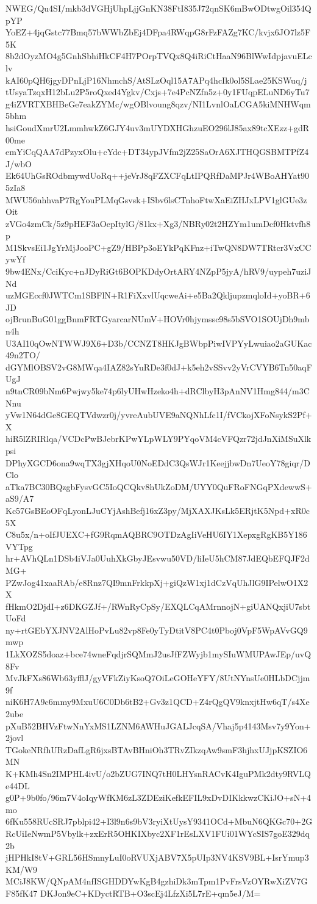 NWEG/Qu4SI/mkb3dVGHjUhpLjjGnKN38FtI835J72qnSK6mBwODtwgOil354QpYP
YoEZ+4jqGstc77Bmq57bWWbZbEj4DFpa4RWqpG8rFzFAZg7KC/kvjx6JO7lz5F5K
8b2dOyzMO4g5GnhSbhiHkCF4H7POrpTVQx8Q4iRiCtHaaN96BlWwIdpjavuELclv
kAI60pQH6jgyDPnLjP16NhmchS/AtSLzOql15A7APq4hcIk0ol5SLae25KSWuq/j
tUsyaTzqxH12bLu2P5roQxed4Ygkv/Cxjs+7e4PcNZfn5z+0y1FUqpELuND6yTu7
g4iZVRTXBHBeGe7eakZYMc/wgOBlvoung8qzv/NI1LvnlOaLCGA5kiMNHWqm5bhm
hsiGoudXmrU2LmmhwkZ6GJY4uv3mUYDXHGhzuEO296lJ85ax89tcXEzz+gdR00me
emYiCqQAA7dPzyxOlu+cYdc+DT34ypJVfm2jZ25SaOrA6XJTHQGSBMTPfZ4J/wbO
Ek64UhGsROdbmywdUoRq++jeVrJ8qFZXCFqLtIPQRfDaMPJr4WBoAHYat905zIa8
MWU56nhhvaP7RgYouPLMqGsvsk+ISbv6lsCTnhoFtwXaEiZHJxLPV1glGUe3zOit
zVGo4zmCk/5z9pHEF3aOepItylG/81kx+Xg3/NBRy02t2HZYm1umDcf0Hktvfh8p
M1SkvsEi1JgYrMjJooPC+gZ9/HBPp3oEYkPqKFnz+iTwQN8DW7TRtcr3VxCCywYf
9bw4ENx/CciKyc+nJDyRiGt6BOPKDdyOrtARY4NZpP5jyA/hRV9/uypeh7uziJNd
uzMGEccf0JWTCm1SBFlN+R1FiXxvlUqcweAi+e5Ba2QkljupzmqloId+yoBR+6JD
ojBrunBuG01ggBnmFRTGyarcarNUmV+HOVr0hjymssc98s5bSVO1SOUjDh9mbn4h
U3AI10qOwNTWWJ9X6+D3b/CCNZT8HKJgBWbpPiwIVPYyLwuiao2aGUKac49n2TO/
dGYMlOBSV2vG8MWqa4IAZ82sYuRDe3f0dJ+k5eh2vSSvv2yVrCVYB6Tn50aqFUgJ
n9tnCR09bNm6Pwjwy5ke74p6lyUHwHzeko4h+dRClbyH3pAnNV1Hmg844/m3CNnu
yVw1N64dGe8GEQTVdwzr0j/yvreAubUVE9aNQNhLfc1I/fVCkojXFoNsykS2Pf+X
hiR5lZRIRlqa/VCDcPwBJebrKPwYLpWLY9PYqoVM4cVFQzr72jdJnXiMSuXlkpsi
DPhyXGCD6ona9wqTX3gjXHqoU0NoEDdC3QsWJr1KeejjbwDn7UeoY78giqr/DClo
aTka7BC30BQzgbFysvGC5IoQCQkv8hUkZoDM/UYY0QuFRoFNGqPXdewwS+aS9/A7
Kc57GsBEoOFqLyonLJuCYjAshBefj16xZ3py/MjXAXJKsLk5ERjtK5Npd+xR0c5X
C8u5x/n+oIfJUEXC+fG9RqmAQBRC9OTDzAgIiVeHU6IY1XepxgRgKB5Y186VYTpg
hr+AVhQLn1DSb4iVJa0UuhXkGbyJEsvwu50VD/liIeU5hCM87JdEQbEFQJF2dMG+
PZwJog41xaaRAb/e8Rnz7QI9mnFrkkpXj+giQzW1xj1dCzVqUhJlG9IPelwO1X2X
fHkmO2DjdI+z6DKGZJf+/RWnRyCpSy/EXQLCqAMrnnojN+giUANQxjiU7sbtUoFd
ny+rtGEbYXJNV2AlHoPvLu82vp8Fe0yTyDtitV8PC4t0Pboj0VpF5WpAVvGQ9mwp
1LkXOZS5doaz+bce74wneFqdjrSQMmJ2usJfFZWyjb1mySIuWMUPAwJEp/uvQ8Fv
MvJkFXs86Wb63yfflJ/gyVFkZiyKsoQ7OiLeGOHeYFY/8UtNYnsUe0HLbDCjjm9f
niK6H7A9c6mmy9MxuU6C0Db6tB2+Gv3z1QCD+Z4rQgQV9knxjtHw6qT/s4Xe2ube
pXuB52BHVzFtwNnYxMS1LZNM6AWHuJGALJcqSA/Vhaj5p4143Msv7y9Yon+2jovl
TGokeNRfhURzDafLgR6jxsBTAvBHniOh3TRvZIkzqAw9smF3hjhxUJjpKSZIO6MN
K+KMh4Sn2IMPHL4ivU/o2bZUG7INQ7tH0LHYsnRACvK4IguPMk2dty9RVLQe44DL
g0P+9b0fo/96m7V4oIqyWfKM6zL3ZDEziKefkEFIL9xDvDIKkkwzCKiJO+sN+4mo
6fKu558RUcSRJ7pblpi42+I3l9n6s9bV3ryiXtUysY9341OCd+MbuN6QKGc70+2G
RcUiIeNwmP5Vbylk+zxErR5OHKIXbyc2XF1rEsLXV1FUi01WYcSIS7goE329dq2b
jHPHkI8tV+GRL56HSmnyLuI0oRVUXjABV7X5pUIp3NV4KSV9BL+IsrYmup3KM/W9
MCiJ8KW/QNpAM4nfISGHDDYwKgB4gzhiDk3mTpm1PvFrsVzOYRwXiZV7GF85fK47
DKJon9eC+KDyctRTB+O3scEj4LfzXi5L7rE+qm5eJ/M=
